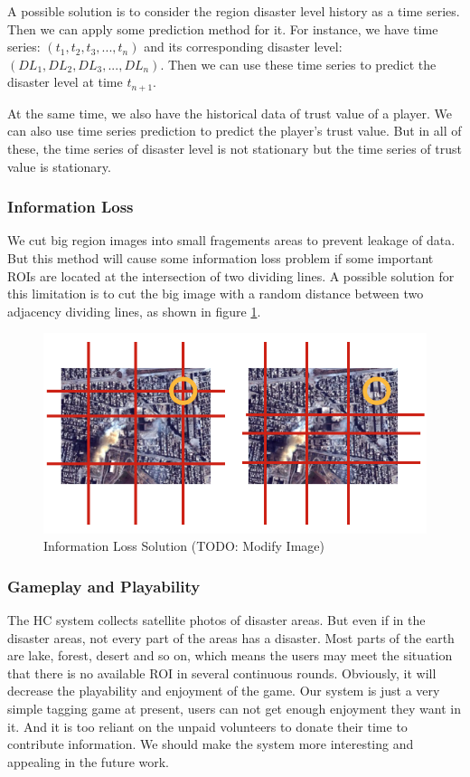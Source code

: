 A possible solution is to consider the region disaster level history as a time series. Then we can apply
some prediction method for it. For instance, we have time series: $(t_1, t_2, t_3, ..., t_n)$
and its corresponding disaster level: $(DL_1, DL_2, DL_3, ..., DL_n)$.
Then we can use these time series to predict the disaster level at time $t_{n+1}$.

At the same time, we also have the historical data of trust value of a player. We can also
use time series prediction to predict the player's trust value. But in all of these, the time series
of disaster level is not stationary but the time series of trust value is stationary.

\subsubsection{Information Loss}
We cut big region images into small fragements areas to prevent leakage of data. 
But this method will cause some information loss problem if some important ROIs are 
located at the intersection of two dividing lines.
A possible solution for this limitation is to cut the big image with a random distance 
between two adjacency dividing lines, as shown in figure \ref{fig:information_loss}.

\begin{figure}[htp]
\centering
\includegraphics[width=0.5\columnwidth]{figures/information_loss}
\caption{Information Loss Solution (TODO: Modify Image)}
\label{fig:information_loss}
\end{figure}

\subsubsection{Gameplay and Playability}

The HC system collects satellite photos of disaster areas. But even if in the disaster areas, 
not every part of the areas has a disaster. Most parts of the earth are lake, forest, 
desert and so on, which means the users may meet the situation that there is no available 
ROI in several continuous rounds. Obviously, it will decrease the playability and enjoyment of the game.
Our system is just a very simple tagging game at present, users can not get enough enjoyment they want in it. 
And it is too reliant on the unpaid volunteers to donate their time to contribute information. 
We should make the system more interesting and appealing in the future work.
